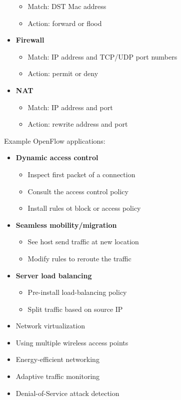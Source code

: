 \documentclass[a4paper, fontsize=8pt, landscape, DIV=1]{scrartcl}
\begin{document}
\begin{multicols*}{4}
\begin{itemize}[noitemsep]
			\begin{itemize}
				\item Match: DST Mac address
				\item Action: forward or flood
			\end{itemize}
			\item \textbf{Firewall}
			\begin{itemize}
				\item Match: IP address and TCP/UDP port numbers
				\item Action: permit or deny
			\end{itemize}
			\item \textbf{NAT}
			\begin{itemize}
				\item Match: IP address and port 
				\item Action: rewrite address and port
			\end{itemize}
		\end{itemize}
		Example OpenFlow applications:
		\begin{itemize}[noitemsep]
			\item \textbf{Dynamic access control}
			\begin{itemize}
				\item Inspect first packet of a connection
				\item Consult the access control policy
				\item Install rules ot block or access policy
			\end{itemize}
			\item \textbf{Seamless mobility/migration}
			\begin{itemize}
				\item See host send traffic at new location
				\item Modify rules to reroute the traffic
			\end{itemize}
			\item \textbf{Server load balancing}
			\begin{itemize}
				\item Pre-install load-balancing policy
				\item Split traffic based on source IP
			\end{itemize}
			\item Network virtualization
			\item Using multiple wireless access points
			\item Energy-efficient networking
			\item Adaptive traffic monitoring
			\item Denial-of-Service attack detection
		\end{itemize}
		

\end{multicols*}
\end{document}
